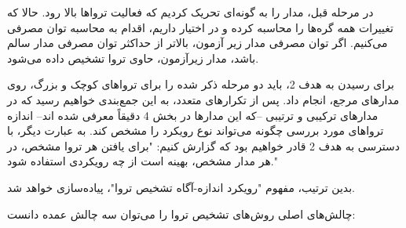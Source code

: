  در مرحله قبل، مدار را به گونه‌ای تحریک کردیم که فعالیت تروا‌ها بالا رود. حالا که تغییرات همه گره‌ها را محاسبه کرده و در اختیار داریم، اقدام به محاسبه توان مصرفی می‌کنیم. اگر توان مصرفی مدار زیر آزمون، بالاتر از حداکثر توان مصرفی مدار سالم باشد، مدار زیرآزمون، حاوی تروا تشخیص داده می‌شود. 
 
 برای رسیدن به هدف 2، باید دو مرحله ذکر شده را برای تروا‌های کوچک و بزرگ، روی مدارهای مرجع، انجام داد. پس از تکرارهای متعدد، به این جمع‌بندی خواهیم رسید که در مدارهای ترکیبی و ترتیبی --که این مدارها در بخش 4 دقیقاً معرفی شده اند-- اندازه تروا‌‌های مورد بررسی چگونه می‌تواند نوع رویکرد را مشخص کند. به عبارت دیگر، با دسترسی به هدف 2 قادر خواهیم بود که گزارش کنیم: "برای یافتن هر تروا مشخص، در هر مدار مشخص، بهینه است از چه رویکردی استفاده شود."
 
  بدین ترتیب، مفهوم "رویکرد اندازه-آگاه تشخیص تروا"، پیاده‌سازی خواهد شد.
 

چالش‌های اصلی روش‌های تشخیص تروا را می‌توان سه چالش عمده دانست:

